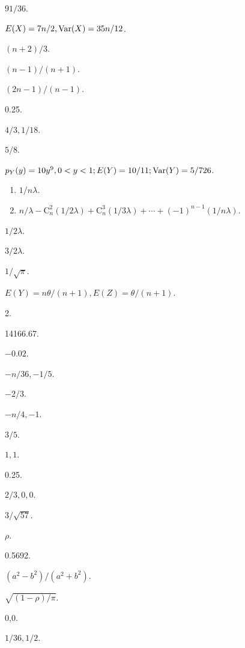 \begin{answer}
  \item $91/36$.
  \item $E(X)=7n/2,\operatorname{Var}(X)=35n/12$.
  \item $(n+2)/3$.
  \item $(n-1)/(n+1)$.
  \item $(2n-1)/(n-1)$.
  \item 0.25.
  \item $4/3,1/18$.
  \item $5/8$.
  \item $p_Y(y)=10y^9,0<y<1;E(Y)=10/11;\operatorname{Var}(Y)=5/726$.
  \item \begin{enumerate}
    \item $1/n\lambda$.
    \item $n/\lambda-\mathrm C_n^2(1/2\lambda)+\mathrm C_n^3
    (1/3\lambda)+\cdots+(-1)^{n-1}(1/n\lambda)$.
  \end{enumerate}
  \item \begin{enumerate*}
    \item $1/2\lambda$.
    \item $3/2\lambda$.
  \end{enumerate*}
  \item $1/\sqrt\pi$.
  \item $E(Y)=n\theta/(n+1),E(Z)=\theta/(n+1)$.
  \item 2.
  \item 14166.67.
  \item $-0.02$.
  \item $-n/36,-1/5$.
  \item $-2/3$.
  \item $-n/4,-1$.
  \item $3/5$.
  \item $1,1$.
  \item 0.25.
  \item $2/3,0,0$.
  \item $3/\sqrt{57}$.
  \item $\rho$.
  \item 0.5692.
  \item $(a^2-b^2)/(a^2+b^2)$.
  \item \begin{enumerate*}
    \item $\sqrt{(1-\rho)/\pi}$.
    \item 0,0.
  \end{enumerate*}
  \item $1/36,1/2$.

\end{answer}
